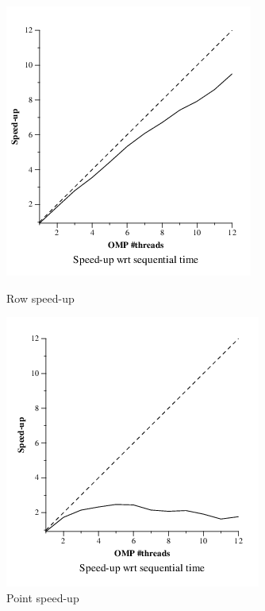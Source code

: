 \documentclass[a4paper]{article}
\begin{document}
\begin{figure}[H]
	\centering
	\begin{minipage}[b]{0.49\textwidth}
		\centering
		\includegraphics[width=\textwidth]{images/image11}
		\caption{Row speed-up}
	\end{minipage}
	\begin{minipage}[b]{0.49\textwidth}
		\centering
		\includegraphics[width=\textwidth]{images/image01}
		\caption{Point speed-up}
	\end{minipage}
\end{figure}
\end{document}
